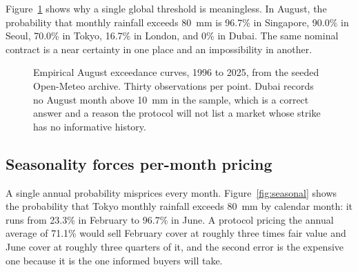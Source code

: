 \documentclass[11pt,a4paper]{article}
\begin{document}
Figure~\ref{fig:exceedance} shows why a single global threshold is meaningless. In August,
the probability that monthly rainfall exceeds 80~mm is 96.7\% in Singapore, 90.0\% in Seoul,
70.0\% in Tokyo, 16.7\% in London, and 0\% in Dubai. The same nominal contract is a near
certainty in one place and an impossibility in another.

\begin{figure}[h]
\centering
{}
\caption{Empirical August exceedance curves, 1996 to 2025, from the seeded Open-Meteo
archive. Thirty observations per point. Dubai records no August month above 10~mm in the
sample, which is a correct answer and a reason the protocol will not list a market whose
strike has no informative history.}
\label{fig:exceedance}
\end{figure}

\subsection{Seasonality forces per-month pricing}

A single annual probability misprices every month. Figure~\ref{fig:seasonal} shows the
probability that Tokyo monthly rainfall exceeds 80~mm by calendar month: it runs from 23.3\%
in February to 96.7\% in June. A protocol pricing the annual average of 71.1\% would sell
February cover at roughly three times fair value and June cover at roughly three quarters of
it, and the second error is the expensive one because it is the one informed buyers will
take.
\end{document}
